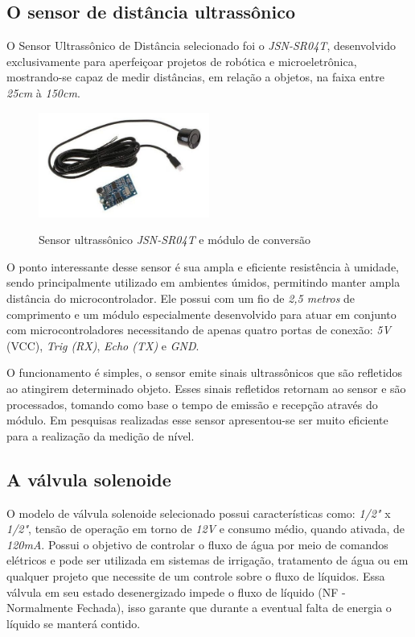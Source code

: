 \subsection{O sensor de distância ultrassônico}
\label{ssec:sensor_ultra}
O Sensor Ultrassônico de Distância selecionado foi o \textit{JSN-SR04T}, desenvolvido exclusivamente para aperfeiçoar projetos de robótica e microeletrônica, mostrando-se capaz de medir distâncias, em relação a objetos, na faixa entre \textit{25cm} à \textit{150cm}.

\begin{figure}[H]
	\centering
	\caption{Sensor ultrassônico \textit{JSN-SR04T} e módulo de conversão}
	\includegraphics[width=0.5\textwidth]{figuras/sensor_ultra.jpg}
	\label{fig:sensor_ultra}
\end{figure}

O ponto interessante desse sensor é sua ampla e eficiente resistência à umidade, sendo principalmente utilizado em ambientes úmidos, permitindo manter ampla distância do microcontrolador. Ele possui com um fio de \textit{2,5 metros} de comprimento e um módulo especialmente desenvolvido para atuar em conjunto com microcontroladores necessitando de apenas quatro portas de conexão: \textit{5V} (VCC), \textit{Trig (RX)}, \textit{Echo (TX)} e \textit{GND}.

O funcionamento é simples, o sensor emite sinais ultrassônicos que são refletidos ao atingirem determinado objeto. Esses sinais refletidos retornam ao sensor e são processados, tomando como base o tempo de emissão e recepção através do módulo. Em pesquisas realizadas esse sensor apresentou-se ser muito eficiente para a realização da medição de nível.

\subsection{A válvula solenoide}

 O modelo de válvula solenoide selecionado possui características como:  \textit{1/2"} x \textit{1/2"}, tensão de operação em torno de \textit{12V} e consumo médio, quando ativada, de \textit{120mA}. Possui o objetivo de controlar o fluxo de água por meio de comandos elétricos e pode ser utilizada em sistemas de irrigação, tratamento de água ou em qualquer projeto que necessite de um controle sobre o fluxo de líquidos. Essa válvula em seu estado desenergizado impede o fluxo de líquido (NF - Normalmente Fechada), isso garante que durante a eventual falta de energia o líquido se manterá contido.
 
